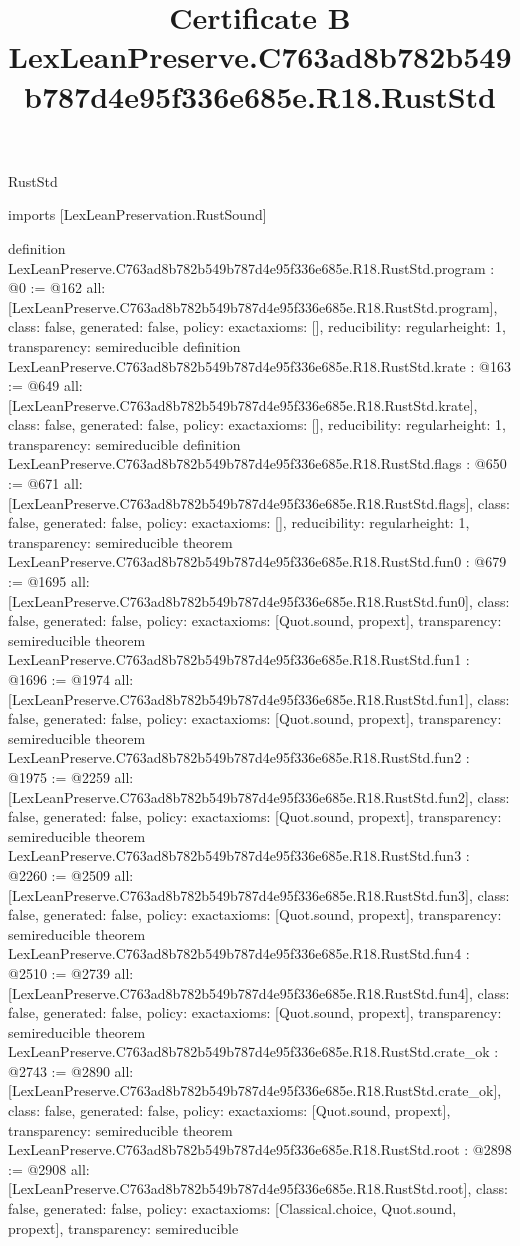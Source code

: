 \begin{lexlean}{RustStd}
\title{Certificate B LexLeanPreserve.C763ad8b782b549b787d4e95f336e685e.R18.RustStd}
\begin{coremodule}
imports [LexLeanPreservation.RustSound]

definition LexLeanPreserve.C763ad8b782b549b787d4e95f336e685e.R18.RustStd.program : @0 := @162 {
  all: [LexLeanPreserve.C763ad8b782b549b787d4e95f336e685e.R18.RustStd.program],
  class: false,
  generated: false,
  policy: exact{axioms: []},
  reducibility: regular{height: 1},
  transparency: semireducible
}
definition LexLeanPreserve.C763ad8b782b549b787d4e95f336e685e.R18.RustStd.krate : @163 := @649 {
  all: [LexLeanPreserve.C763ad8b782b549b787d4e95f336e685e.R18.RustStd.krate],
  class: false,
  generated: false,
  policy: exact{axioms: []},
  reducibility: regular{height: 1},
  transparency: semireducible
}
definition LexLeanPreserve.C763ad8b782b549b787d4e95f336e685e.R18.RustStd.flags : @650 := @671 {
  all: [LexLeanPreserve.C763ad8b782b549b787d4e95f336e685e.R18.RustStd.flags],
  class: false,
  generated: false,
  policy: exact{axioms: []},
  reducibility: regular{height: 1},
  transparency: semireducible
}
theorem LexLeanPreserve.C763ad8b782b549b787d4e95f336e685e.R18.RustStd.fun0 : @679 := @1695 {
  all: [LexLeanPreserve.C763ad8b782b549b787d4e95f336e685e.R18.RustStd.fun0],
  class: false,
  generated: false,
  policy: exact{axioms: [Quot.sound, propext]},
  transparency: semireducible
}
theorem LexLeanPreserve.C763ad8b782b549b787d4e95f336e685e.R18.RustStd.fun1 : @1696 := @1974 {
  all: [LexLeanPreserve.C763ad8b782b549b787d4e95f336e685e.R18.RustStd.fun1],
  class: false,
  generated: false,
  policy: exact{axioms: [Quot.sound, propext]},
  transparency: semireducible
}
theorem LexLeanPreserve.C763ad8b782b549b787d4e95f336e685e.R18.RustStd.fun2 : @1975 := @2259 {
  all: [LexLeanPreserve.C763ad8b782b549b787d4e95f336e685e.R18.RustStd.fun2],
  class: false,
  generated: false,
  policy: exact{axioms: [Quot.sound, propext]},
  transparency: semireducible
}
theorem LexLeanPreserve.C763ad8b782b549b787d4e95f336e685e.R18.RustStd.fun3 : @2260 := @2509 {
  all: [LexLeanPreserve.C763ad8b782b549b787d4e95f336e685e.R18.RustStd.fun3],
  class: false,
  generated: false,
  policy: exact{axioms: [Quot.sound, propext]},
  transparency: semireducible
}
theorem LexLeanPreserve.C763ad8b782b549b787d4e95f336e685e.R18.RustStd.fun4 : @2510 := @2739 {
  all: [LexLeanPreserve.C763ad8b782b549b787d4e95f336e685e.R18.RustStd.fun4],
  class: false,
  generated: false,
  policy: exact{axioms: [Quot.sound, propext]},
  transparency: semireducible
}
theorem LexLeanPreserve.C763ad8b782b549b787d4e95f336e685e.R18.RustStd.crate_ok : @2743 := @2890 {
  all: [LexLeanPreserve.C763ad8b782b549b787d4e95f336e685e.R18.RustStd.crate_ok],
  class: false,
  generated: false,
  policy: exact{axioms: [Quot.sound, propext]},
  transparency: semireducible
}
theorem LexLeanPreserve.C763ad8b782b549b787d4e95f336e685e.R18.RustStd.root : @2898 := @2908 {
  all: [LexLeanPreserve.C763ad8b782b549b787d4e95f336e685e.R18.RustStd.root],
  class: false,
  generated: false,
  policy: exact{axioms: [Classical.choice, Quot.sound, propext]},
  transparency: semireducible
}


\end{coremodule}
\end{lexlean}
